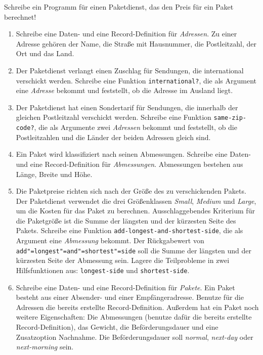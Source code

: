 \begin{aufgabe}

  Schreibe ein Programm für einen Paketdienst, das den Preis
  für ein Paket berechnet!
  \begin{enumerate}
    
  \item Schreibe eine Daten- und eine Record-Definition für
    \textit{Adressen}.  Zu einer Adresse gehören der Name, die Straße
    mit Hausnummer, die Postleitzahl, der Ort und das Land.
    
  \item Der Paketdienst verlangt einen Zuschlag für Sendungen, die
    international verschickt werden.  Schreibe eine Funktion
    \texttt{international?}, die als Argument eine \textit{Adresse}
    bekommt und feststellt, ob die Adresse im Ausland liegt.

  \item Der Paketdienst hat einen Sondertarif für Sendungen, die
    innerhalb der gleichen Postleitzahl verschickt werden.  Schreibe
    eine Funktion \texttt{same-zip-code?}, die als Argumente zwei
    \textit{Adressen} bekommt und feststellt, ob die Postleitzahlen
    und die Länder der beiden Adressen gleich sind.

  \item Ein Paket wird klassifiziert nach seinen Abmessungen.
    Schreibe eine Daten- und eine Record-Definition für
    \textit{Abmessungen}.  Abmessungen bestehen aus Länge, Breite und
    Höhe.

  \item Die Paketpreise richten sich nach der Größe des zu
    verschickenden Pakets.  Der Paketdienst verwendet die drei
    Größenklassen \textit{Small}, \textit{Medium} und \textit{Large},
    um die Kosten für das Paket zu berechnen.  Ausschlaggebendes
    Kriterium für die Paketgröße ist die Summe der längsten und der
    kürzesten Seite des Pakets.  Schreibe eine Funktion
    \texttt{add-longest-and-shortest-side}, die als Argument eine
    \textit{Abmessung} bekommt.  Der Rückgabewert von
    \texttt{add"=longest"=and"=shortest"=side} soll die Summe der längsten
    und der kürzesten Seite der Abmessung sein.  Lagere die
    Teilprobleme in zwei Hilfsfunktionen aus: \texttt{longest-side}
    und \texttt{shortest-side}.

  \item Schreibe eine Daten- und eine Record-Definition für
    \textit{Pakete}.  Ein Paket besteht aus einer Absender- und einer
    Empfängeradresse.  Benutze für die Adressen die bereits
    erstellte Record-Definition.  Außerdem hat ein Paket noch weitere
    Eigenschaften: Die Abmessungen (benutze dafür die bereits
    erstellte Record-Definition), das Gewicht, die Beförderungsdauer
    und eine Zusatz\-option Nachnahme.  Die Beförderungsdauer soll
    \emph{normal}, \emph{next-day} oder \emph{next-morning} sein.


\end{enumerate}
\end{aufgabe}
